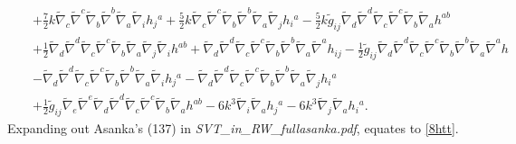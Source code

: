 \documentclass[10pt,letterpaper]{article}
\numberwithin{equation}{section}
\begin{document}
\begin{eqnarray}
&& + \tfrac{7}{2} k \tilde{\nabla}_{c}\tilde{\nabla}^{c}\tilde{\nabla}_{b}\tilde{\nabla}^{b}\tilde{\nabla}_{a}\tilde{\nabla}_{i}h_{j}{}^{a} + \tfrac{5}{2} k \tilde{\nabla}_{c}\tilde{\nabla}^{c}\tilde{\nabla}_{b}\tilde{\nabla}^{b}\tilde{\nabla}_{a}\tilde{\nabla}_{j}h_{i}{}^{a} -  \tfrac{5}{2} k \tilde{g}_{ij} \tilde{\nabla}_{d}\tilde{\nabla}^{d}\tilde{\nabla}_{c}\tilde{\nabla}^{c}\tilde{\nabla}_{b}\tilde{\nabla}_{a}h^{ab} \nonumber \\ 
&& + \tfrac{1}{2} \tilde{\nabla}_{d}\tilde{\nabla}^{d}\tilde{\nabla}_{c}\tilde{\nabla}^{c}\tilde{\nabla}_{b}\tilde{\nabla}_{a}\tilde{\nabla}_{j}\tilde{\nabla}_{i}h^{ab} + \tilde{\nabla}_{d}\tilde{\nabla}^{d}\tilde{\nabla}_{c}\tilde{\nabla}^{c}\tilde{\nabla}_{b}\tilde{\nabla}^{b}\tilde{\nabla}_{a}\tilde{\nabla}^{a}h_{ij} -  \tfrac{1}{2} \tilde{g}_{ij} \tilde{\nabla}_{d}\tilde{\nabla}^{d}\tilde{\nabla}_{c}\tilde{\nabla}^{c}\tilde{\nabla}_{b}\tilde{\nabla}^{b}\tilde{\nabla}_{a}\tilde{\nabla}^{a}h \nonumber \\ 
&& -  \tilde{\nabla}_{d}\tilde{\nabla}^{d}\tilde{\nabla}_{c}\tilde{\nabla}^{c}\tilde{\nabla}_{b}\tilde{\nabla}^{b}\tilde{\nabla}_{a}\tilde{\nabla}_{i}h_{j}{}^{a} -  \tilde{\nabla}_{d}\tilde{\nabla}^{d}\tilde{\nabla}_{c}\tilde{\nabla}^{c}\tilde{\nabla}_{b}\tilde{\nabla}^{b}\tilde{\nabla}_{a}\tilde{\nabla}_{j}h_{i}{}^{a} \nonumber \\ 
&& + \tfrac{1}{2} \tilde{g}_{ij} \tilde{\nabla}_{e}\tilde{\nabla}^{e}\tilde{\nabla}_{d}\tilde{\nabla}^{d}\tilde{\nabla}_{c}\tilde{\nabla}^{c}\tilde{\nabla}_{b}\tilde{\nabla}_{a}h^{ab} - 6 k^3 \tilde{\nabla}_{i}\tilde{\nabla}_{a}h_{j}{}^{a} - 6 k^3 \tilde{\nabla}_{j}\tilde{\nabla}_{a}h_{i}{}^{a}.
\label{8htt}
\end{eqnarray}
Expanding out Asanka's (137) in \emph{SVT\_in\_RW\_fullasanka.pdf}, equates to \eqref{8htt}. 
\end{document}

